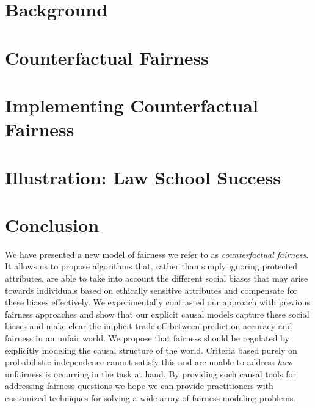 \documentclass{article}[12pt]
\begin{document}
\section{Background}
\label{sec:background}


%

%

\section{Counterfactual Fairness}
\label{sec:count_fair}


\section{Implementing Counterfactual Fairness}
\label{sec:methods}


\section{Illustration: Law School Success}
\label{sec:experiments}


\section{Conclusion}
\label{sec:conclusion}
We have presented a new model of fairness we refer to as {\em
  counterfactual fairness}. It allows us to propose algorithms
that, rather than simply ignoring protected attributes, are able to
take into account the different social biases that may arise towards
individuals based on ethically sensitive attributes
and compensate
for these biases effectively. We experimentally contrasted our
approach with previous fairness approaches and show that our explicit
causal models capture these social biases and make clear the implicit
trade-off between prediction accuracy and fairness in an unfair
world. We propose that fairness should be regulated by explicitly
modeling the causal structure of the world. Criteria based purely on
probabilistic independence cannot satisfy this and are unable to
address \emph{how} unfairness is occurring in the task at hand. By
providing such causal tools for addressing fairness questions we hope
we can provide practitioners with customized techniques for solving a
wide array of fairness modeling problems.




%
\end{document}
